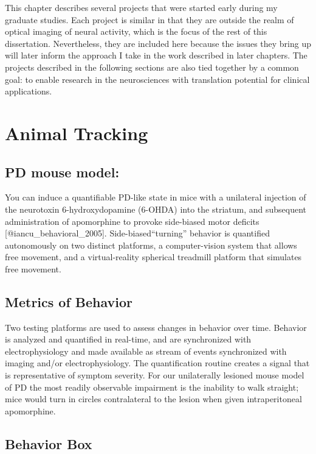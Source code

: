 \documentclass[../main.tex]{subfiles}
\begin{document}
\thispagestyle{myheadings}


This chapter describes several projects that were started early during my graduate studies.
Each project is similar in that they are outside the realm of optical imaging of neural activity, which is the focus of the rest of this dissertation.
Nevertheless, they are included here because the issues they bring up will later inform the approach I take in the work described in later chapters.
The projects described in the following sections are also tied together by a common goal: to enable research in the neurosciences with translation potential for clinical applications.

\section{
  Animal Tracking}\label{animal-tracking}

\subsection{PD mouse model:}\label{pd-mouse-model}

You can induce a quantifiable PD-like state in mice with a unilateral injection of the neurotoxin 6-hydroxydopamine (6-OHDA) into the striatum, and subsequent administration of apomorphine to provoke side-biased motor deficits {[}@iancu\_behavioral\_2005{]}.
Side-biased``turning'' behavior is quantified autonomously on two distinct platforms, a computer-vision system that allows free movement, and a virtual-reality spherical treadmill platform that simulates free movement.

\subsection{
	Metrics of Behavior}\label{metrics-of-behavior}

Two testing platforms are used to assess changes in behavior over time.
Behavior is analyzed and quantified in real-time, and are synchronized with electrophysiology and made available as stream of events synchronized with imaging and/or electrophysiology.
The quantification routine creates a signal that is representative of symptom severity.
For our unilaterally lesioned mouse model of PD the most readily observable impairment is the inability to walk straight;
mice would turn in circles
contralateral to the lesion when given intraperitoneal apomorphine.

\subsection{
	Behavior Box}\label{behavior-box}
\end{document}
